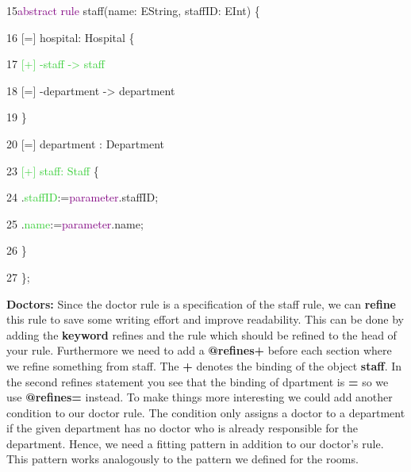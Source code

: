 {

15\hspace{0.5cm}\textcolor{Purple}{abstract rule} staff(name: EString, staffID: EInt) \{ 

16\hspace{1cm}		[=] hospital: Hospital \{

17\hspace{1.5cm} \textcolor{LimeGreen}{[+] -staff -> staff} 

18\hspace{1.5cm}			[=] -department -> department

19\hspace{1cm}		\}

20\hspace{1cm}		[=] department : Department

23\hspace{1cm} \textcolor{LimeGreen}{[+] staff: Staff} \{ 

24\hspace{1.5cm}		.\textcolor{LimeGreen}{staffID}:=\textcolor{Purple}{parameter}.staffID;

25\hspace{1.5cm}			.\textcolor{LimeGreen}{name}:=\textcolor{Purple}{parameter}.name;

26\hspace{1cm}		\}

27\hspace{0.5cm}	\};\newline\newline

}


\textbf{Doctors:}\newline
Since the doctor rule is a specification of the staff rule, we can \textbf{refine} this rule to save some writing effort and improve readability. This can be done by adding the \textbf{keyword} \textsf{refines} and the rule which should be refined to the head of your rule. Furthermore we need to add a \textbf{@refines+} before each section where we refine something from staff. The \textbf{+} denotes the binding of the object \textbf{staff}. In the second refines statement you see that the binding of dpartment is \textbf{=} so we use \textbf{@refines=} instead.\newline
To make things more interesting we could add another condition to our doctor rule. The condition only assigns a doctor to a department if the given department has no doctor who is already responsible for the department. Hence, we need a fitting pattern in addition to our doctor’s rule.\newline
This pattern works analogously to the pattern we defined for the rooms.\newline\newline

